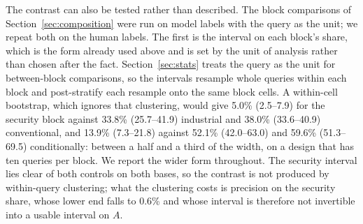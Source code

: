 \documentclass[1p,times]{elsarticle}
\begin{document}
The contrast can also be tested rather than described. The block comparisons of Section~\ref{sec:composition} were run on model labels with the query as the unit; we repeat both on the human labels. The first is the interval on each block's share, which is the form already used above and is set by the unit of analysis rather than chosen after the fact. Section~\ref{sec:stats} treats the query as the unit for between-block comparisons, so the intervals resample whole queries within each block and post-stratify each resample onto the same block cells. A within-cell bootstrap, which ignores that clustering, would give 5.0\% (2.5--7.9) for the security block against 33.8\% (25.7--41.9) industrial and 38.0\% (33.6--40.9) conventional, and 13.9\% (7.3--21.8) against 52.1\% (42.0--63.0) and 59.6\% (51.3--69.5) conditionally: between a half and a third of the width, on a design that has ten queries per block. We report the wider form throughout. The security interval lies clear of both controls on both bases, so the contrast is not produced by within-query clustering; what the clustering costs is precision on the security share, whose lower end falls to 0.6\% and whose interval is therefore not invertible into a usable interval on $A$.
\end{document}
